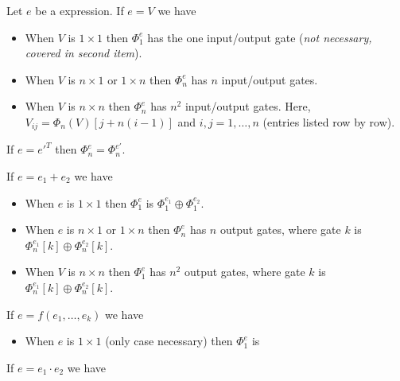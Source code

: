 Let $e$ be a \langfor expression. If $e=V$ we have
\begin{itemize}
	\item When $V$ is $1\times 1$ then $\Phi^e_1$ has the one input/output gate (\textit{not necessary, covered in second item}).
	\item When $V$ is $n\times 1$ or $1\times n$ then $\Phi^e_n$ has $n$ input/output gates.
	\item When $V$ is $n\times n$ then $\Phi^e_n$ has $n^2$ input/output gates. Here, $V_{ij}=\Phi_n(V)\left[ j+n(i-1)\right]$ and $i,j=1,\ldots, n$ (entries listed row by row).
\end{itemize}

If $e=e'^T$ then $\Phi^e_n=\Phi^{e'}_n$. 

If $e=e_1 + e_2$ we have

\begin{itemize}
	\item When $e$ is $1\times 1$ then $\Phi^e_1$ is $\Phi^{e_1}_1 \oplus \Phi^{e_2}_1$.
	\item When $e$ is $n\times 1$ or $1\times n$ then $\Phi^e_n$ has $n$ output gates, where gate $k$ is $\Phi^{e_1}_n[k] \oplus \Phi^{e_2}_n[k]$.
	\item When $V$ is $n\times n$ then $\Phi^e_1$ has $n^2$ output gates, where gate $k$ is $\Phi^{e_1}_n[k] \oplus \Phi^{e_2}_n[k]$.
\end{itemize}

If $e=f(e_1, \ldots, e_k)$ we have

\begin{itemize}
	\item When $e$ is $1\times 1$ (only case necessary) then $\Phi^e_1$ is 
	
\begin{center}
\end{center}

\end{itemize}

If $e=e_1\cdot e_2$ we have

